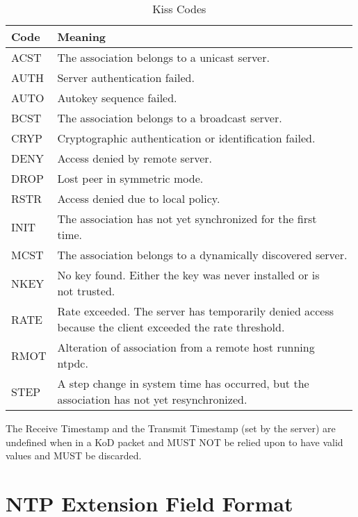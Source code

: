 \begin{table}[htb]
\center
\begin{tabular}{| l | l |}
\hline
Code & Meaning \\
\hline
\hline
ACST & The association belongs to a unicast server. \\
AUTH & Server authentication failed. \\
AUTO & Autokey sequence failed. \\
BCST & The association belongs to a broadcast server. \\
CRYP & Cryptographic authentication or identification failed. \\
DENY & Access denied by remote server. \\
DROP & Lost peer in symmetric mode. \\
RSTR & Access denied due to local policy. \\
INIT & \makecell[l]{The association has not yet synchronized for the first \\ time.} \\
MCST & The association belongs to a dynamically discovered server.\\
NKEY & \makecell[l]{No key found. Either the key was never installed or is \\ not trusted.} \\
RATE & \makecell[l]{Rate exceeded. The server has temporarily denied access \\ because the client exceeded the rate threshold.} \\
RMOT & \makecell[l]{Alteration of association from a remote host running \\ ntpdc.} \\
STEP & \makecell[l]{A step change in system time has occurred, but the \\ association has not yet resynchronized.} \\
\hline
\end{tabular}
\caption{Kiss Codes}
\label{kiss_codes}
\end{table}

The Receive Timestamp and the Transmit Timestamp (set by the server)
are undefined when in a KoD packet and MUST NOT be relied upon to
have valid values and MUST be discarded.

\section{NTP Extension Field Format}
\label{section-7-5}

